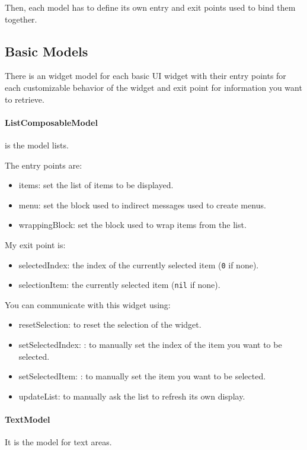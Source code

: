 \documentclass[a4paper,10pt,twoside]{book}
\begin{document}
Then, each model has to define its own entry and exit points used to bind them together.

\subsection{Basic Models}

There is an widget model for each basic UI widget  with their entry points for each customizable behavior of the widget and exit point for information you want to retrieve.

\paragraph{ListComposableModel} is the model lists.

The entry points are:
\begin{itemize}
	\item items: set the list of items to be displayed.
	\item menu: set the block used to indirect messages used to create menus.
	\item wrappingBlock: set the block used to wrap items from the list.
\end{itemize}
My exit point is:
\begin{itemize}
	\item selectedIndex: the index of the currently selected item (\verb+0+ if none).
	\item selectionItem: the currently selected item (\verb+nil+ if none).
\end{itemize}
You can communicate with this widget using:
\begin{itemize}
\item resetSelection: to reset the selection of the widget.
\item setSelectedIndex: : to manually set the index of the item you want to be selected.
\item setSelectedItem: : to manually set the item you want to be selected. 
\item updateList: to manually ask the list to refresh its own display.
\end{itemize}


\paragraph{TextModel} It is the model for text areas.
\end{document}
